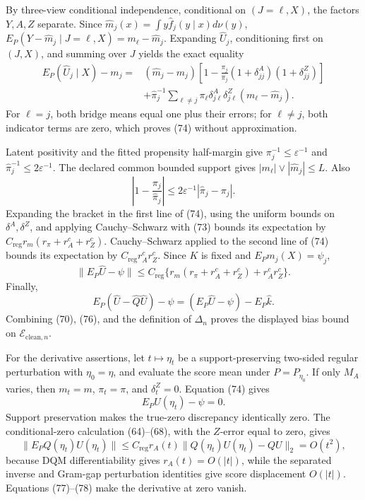 By three-view conditional independence, conditional on \((J=\ell,X)\), the factors \(Y,A,Z\) separate.  Since \(\widehat m_j(x)=\int y\widehat f_j(y\mid x)d\nu(y)\),
\(E_P(Y-\widehat m_j\mid J=\ell,X)=m_\ell-\widehat m_j\).  Expanding \(\widehat U_j\), conditioning first on \((J,X)\), and summing over \(J\) yields the exact equality
\[
\begin{aligned}
 E_P(\widehat U_j\mid X)-m_j
={}&(\widehat m_j-m_j)
 \left[1-\frac{\pi_j}{\widehat\pi_j}
 (1+\delta^A_{jj})(1+\delta^Z_{jj})\right]\\
&+\widehat\pi_j^{-1}\sum_{\ell\ne j}\pi_\ell
 \delta^A_{j\ell}\delta^Z_{j\ell}(m_\ell-\widehat m_j).       \tag{74}
\end{aligned}
\]
For \(\ell=j\), both bridge means equal one plus their errors; for \(\ell\ne j\), both indicator terms are zero, which proves (74) without approximation.

Latent positivity and the fitted propensity half-margin give \(\pi_j^{-1}\leq\varepsilon^{-1}\) and \(\widehat\pi_j^{-1}\leq2\varepsilon^{-1}\).  The declared common bounded support gives \(|m_\ell|\vee|\widehat m_j|\leq L\).  Also
\[
 \left|1-\frac{\pi_j}{\widehat\pi_j}\right|
 \leq2\varepsilon^{-1}|\widehat\pi_j-\pi_j|.                  \tag{75}
\]
Expanding the bracket in the first line of (74), using the uniform bounds on \(\delta^A,\delta^Z\), and applying Cauchy--Schwarz with (73) bounds its expectation by
\(C_{\mathrm{reg}}r_m(r_\pi+r_A^c+r_Z^c)\).  Cauchy--Schwarz applied to the second line of (74) bounds its expectation by \(C_{\mathrm{reg}}r_A^cr_Z^c\).  Since \(K\) is fixed and \(E_Pm_j(X)=\psi_j\),
\[
 \|E_P\widehat U-\psi\|
 \leq C_{\mathrm{reg}}
 \{r_m(r_\pi+r_A^c+r_Z^c)+r_A^cr_Z^c\}.                       \tag{76}
\]
Finally,
\[
 E_P(\widehat U-\widehat Q\widehat U)-\psi
 =(E_P\widehat U-\psi)-E_P\widehat k.
\]
Combining (70), (76), and the definition of \(\Delta_n\) proves the displayed bias bound on \(\mathcal E_{\mathrm{clean},n}\).

For the derivative assertions, let \(t\mapsto\eta_t\) be a support-preserving two-sided regular perturbation with \(\eta_0=\eta\), and evaluate the score mean under \(P=P_{\eta_0}\).  If only \(M_A\) varies, then \(m_t=m\), \(\pi_t=\pi\), and \(\delta_t^Z=0\).  Equation (74) gives
\[
 E_PU(\eta_t)-\psi=0.                                          \tag{77}
\]
Support preservation makes the true-zero discrepancy identically zero.  The conditional-zero calculation (64)--(68), with the \(Z\)-error equal to zero, gives
\[
 \|E_PQ(\eta_t)U(\eta_t)\|
 \leq C_{\mathrm{reg}}r_A(t)
 \|Q(\eta_t)U(\eta_t)-QU\|_2=O(t^2),                          \tag{78}
\]
because DQM differentiability gives \(r_A(t)=O(|t|)\), while the separated inverse and Gram-gap perturbation identities give score displacement \(O(|t|)\).  Equations (77)--(78) make the derivative at zero vanish.

